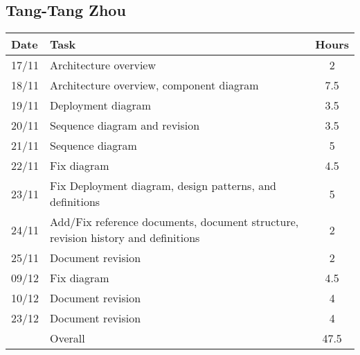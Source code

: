 \subsection{Tang-Tang Zhou}

\begin{table}[H]
\begin{tabularx}{\textwidth}{|l|X|c|}
\hline
\rowcolor[HTML]{C0C0C0} 
Date & Task & Hours\\ \hline
17/11 & Architecture overview & 2\\ \hline
18/11 & Architecture overview, component diagram & 7.5 \\ \hline
19/11 & Deployment diagram & 3.5\\ \hline
20/11 & Sequence diagram and revision & 3.5\\ \hline
21/11 & Sequence diagram & 5 \\ \hline
22/11 & Fix diagram & 4.5 \\ \hline
23/11 & Fix Deployment diagram, design patterns, and definitions  & 5 \\ \hline
24/11 & Add/Fix reference documents, document structure, revision history and definitions & 2 \\ \hline
25/11 & Document revision & 2 \\ \hline
09/12 & Fix diagram & 4.5 \\ \hline
10/12 & Document revision & 4 \\ \hline
23/12 & Document revision & 4 \\ \hline
\rowcolor[HTML]{C0C0C0} 
& Overall & 47.5 \\ \hline
\end{tabularx}
\end{table}
